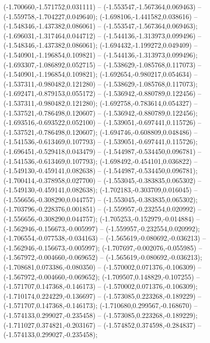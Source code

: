  (-1.700660,-1.571752,0.031111) -- (-1.553547,-1.567364,0.069463) -- (-1.559758,-1.704227,0.049640);
 (-1.698106,-1.441582,0.038616) -- (-1.548346,-1.437382,0.086061) -- (-1.553547,-1.567364,0.069463);
 (-1.696031,-1.317464,0.044712) -- (-1.544136,-1.313973,0.099496) -- (-1.548346,-1.437382,0.086061);
 (-1.694432,-1.199272,0.049409) -- (-1.540901,-1.196854,0.109821) -- (-1.544136,-1.313973,0.099496);
 (-1.693307,-1.086892,0.052715) -- (-1.538629,-1.085768,0.117073) -- (-1.540901,-1.196854,0.109821);
 (-1.692654,-0.980217,0.054634) -- (-1.537311,-0.980482,0.121280) -- (-1.538629,-1.085768,0.117073);
 (-1.692471,-0.879153,0.055172) -- (-1.536942,-0.880789,0.122456) -- (-1.537311,-0.980482,0.121280);
 (-1.692758,-0.783614,0.054327) -- (-1.537521,-0.786498,0.120607) -- (-1.536942,-0.880789,0.122456);
 (-1.693516,-0.693522,0.052100) -- (-1.539051,-0.697441,0.115726) -- (-1.537521,-0.786498,0.120607);
 (-1.694746,-0.608809,0.048486) -- (-1.541536,-0.613469,0.107793) -- (-1.539051,-0.697441,0.115726);
 (-1.696451,-0.529418,0.043479) -- (-1.544987,-0.534450,0.096781) -- (-1.541536,-0.613469,0.107793);
 (-1.698492,-0.454101,0.036822) -- (-1.549130,-0.459141,0.082638) -- (-1.544987,-0.534450,0.096781);
 (-1.700414,-0.378958,0.027700) -- (-1.553045,-0.383835,0.065302) -- (-1.549130,-0.459141,0.082638);
 (-1.702183,-0.303709,0.016045) -- (-1.556656,-0.308290,0.044757) -- (-1.553045,-0.383835,0.065302);
 (-1.703796,-0.228376,0.001851) -- (-1.559957,-0.232554,0.020992) -- (-1.556656,-0.308290,0.044757);
 (-1.705253,-0.152979,-0.014884) -- (-1.562946,-0.156673,-0.005997) -- (-1.559957,-0.232554,0.020992);
 (-1.706554,-0.077538,-0.034163) -- (-1.565619,-0.080692,-0.036213) -- (-1.562946,-0.156673,-0.005997);
 (-1.707697,-0.002076,-0.055985) -- (-1.567972,-0.004660,-0.069652) -- (-1.565619,-0.080692,-0.036213);
 (-1.708681,0.073386,-0.080350) -- (-1.570002,0.071376,-0.106309) -- (-1.567972,-0.004660,-0.069652);
 (-1.709507,0.148829,-0.107255) -- (-1.571707,0.147368,-0.146173) -- (-1.570002,0.071376,-0.106309);
 (-1.710174,0.224229,-0.136697) -- (-1.573085,0.223268,-0.189229) -- (-1.571707,0.147368,-0.146173);
 (-1.710680,0.299567,-0.168670) -- (-1.574133,0.299027,-0.235458) -- (-1.573085,0.223268,-0.189229);
 (-1.711027,0.374821,-0.203167) -- (-1.574852,0.374598,-0.284837) -- (-1.574133,0.299027,-0.235458);
